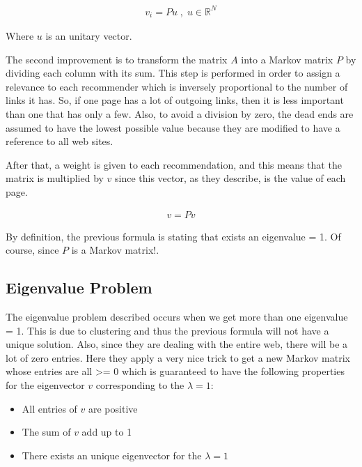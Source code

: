 \documentclass{article}
\begin{document}
\begin{equation*}
\begin{aligned}
v_i = P u \;,\; u \in \mathbb{R}^{N} 
\end{aligned}
\end{equation*} 

Where $u$ is an unitary vector.

The second improvement is to transform the matrix $A$ into a Markov matrix
$P$ by dividing each column with its sum. This step is performed in order to 
assign a relevance to each recommender which is inversely proportional
to the number of links it has. So, if one page has a lot of outgoing links,
then it is less important than one that has only a few.
Also, to avoid a division by zero, the dead ends 
are assumed to have the lowest possible value because they are modified to
have a reference to all web sites.

After that, a weight is given to each recommendation, and this means that
the matrix is multiplied by $v$ since this vector, as they describe, is the
value of each page.

\begin{equation*}
\begin{aligned}
v = P v
\end{aligned}
\end{equation*} 

By definition, the previous formula is stating that exists an eigenvalue = 1.
Of course, since $P$ is a Markov matrix!.

\subsection{Eigenvalue Problem}

The eigenvalue problem described occurs when we get more than one eigenvalue = 1.
This is due to clustering and thus the previous formula will not have a unique solution.
Also, since they are dealing with the entire web, there will be a lot of zero entries.
Here they apply a very nice trick to get a new Markov matrix whose entries are 
all >= 0 which is guaranteed to have the following properties 
for the eigenvector $v$ corresponding to
the $\lambda=1$:

\begin{itemize}
\item All entries of $v$ are positive
\item The sum of $v$ add up to 1
\item There exists an unique eigenvector for the $\lambda=1$
\end{itemize} 
\end{document}
